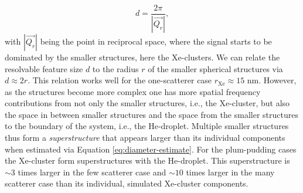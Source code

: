\begin{equation}
d = \frac{2\pi}{\left|\vec{Q_{r}}\right|},
\label{eq:diameter-estimate}
\end{equation}
with $\left|\vec{Q_{r}}\right|$ being the point in reciprocal space, where the signal starts to be dominated by the smaller structures, here the Xe-clusters. We can relate the resolvable feature size $d$ to the radius $r$ of the smaller spherical structures via $d\approx 2 r$. This relation works well for the one-scatterer case $r_{\text{Xe}}\approx 15$ nm. However, as the structures become more complex one has more spatial frequency contributions from not only the smaller structures, i.e., the Xe-cluster, but also the space in between smaller structures and the space from the smaller structures to the boundary of the system, i.e., the He-droplet. Multiple smaller structures thus form a \textit{superstructure} that appears larger than its individual components when estimated via Equation \eqref{eq:diameter-estimate}. For the plum-pudding cases the Xe-cluster form superstructures with the He-droplet. This superstructure is $\sim 3$ times larger in the few scatterer case and $\sim 10$ times larger in the many scatterer case than its individual, simulated Xe-cluster components.\\
